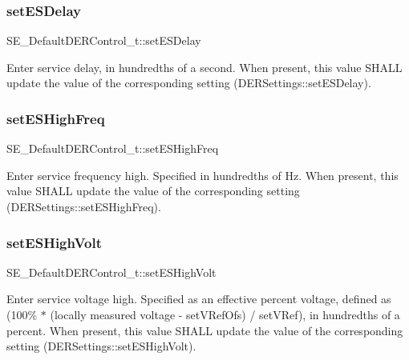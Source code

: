 \subsubsection{\texorpdfstring{set\+E\+S\+Delay}{setESDelay}}
{\footnotesize\ttfamily S\+E\+\_\+\+Default\+D\+E\+R\+Control\+\_\+t\+::set\+E\+S\+Delay}

Enter service delay, in hundredths of a second. When present, this value S\+H\+A\+LL update the value of the corresponding setting (D\+E\+R\+Settings\+::set\+E\+S\+Delay). \mbox{\label{group__DefaultDERControl_ga9b1cda2efced0f19df2502dab08ce4b0}} 
\subsubsection{\texorpdfstring{set\+E\+S\+High\+Freq}{setESHighFreq}}
{\footnotesize\ttfamily S\+E\+\_\+\+Default\+D\+E\+R\+Control\+\_\+t\+::set\+E\+S\+High\+Freq}

Enter service frequency high. Specified in hundredths of Hz. When present, this value S\+H\+A\+LL update the value of the corresponding setting (D\+E\+R\+Settings\+::set\+E\+S\+High\+Freq). \mbox{\label{group__DefaultDERControl_ga818efdf68d11fc69e009abc026a0f981}} 
\subsubsection{\texorpdfstring{set\+E\+S\+High\+Volt}{setESHighVolt}}
{\footnotesize\ttfamily S\+E\+\_\+\+Default\+D\+E\+R\+Control\+\_\+t\+::set\+E\+S\+High\+Volt}

Enter service voltage high. Specified as an effective percent voltage, defined as (100\% $\ast$ (locally measured voltage -\/ set\+V\+Ref\+Ofs) / set\+V\+Ref), in hundredths of a percent. When present, this value S\+H\+A\+LL update the value of the corresponding setting (D\+E\+R\+Settings\+::set\+E\+S\+High\+Volt). \mbox{\label{group__DefaultDERControl_ga27fcac98cfffed69acb39dbefffaac4b}} 
